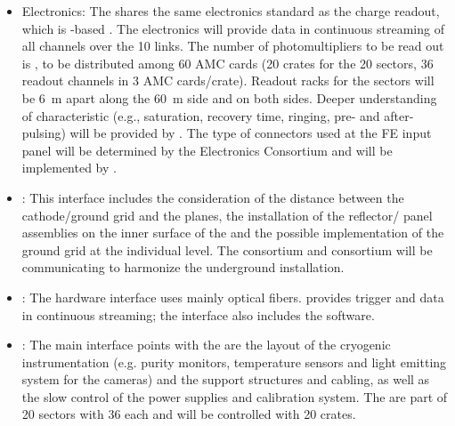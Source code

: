 
\begin{itemize}

\item {} Electronics: The  shares the same  electronics standard as the charge readout, which is -based \cite{utca}. The  electronics will provide data in continuous streaming %
of all  channels over the \SI{10}{\Gbps} links. The number of photomultipliers to be read out is \dpnumpmtch, to be distributed among \num{60} AMC cards (\num{20}  crates for the \num{20}  sectors, \num{36} readout channels in \num{3} AMC cards/crate). Readout racks for the sectors will be \SI{6}{\m} apart along the \SI{60}{\m} side and on both sides. Deeper understanding of  characteristic (e.g., saturation, recovery time, ringing, pre- and after-pulsing) will be provided by  . The type of connectors used at the FE input panel will be determined by the  Electronics Consortium and will be implemented by  .

\item {}: This interface includes the consideration of the distance between the cathode/ground grid and the  planes, the installation of the reflector/ panel assemblies on the inner surface of the  and the possible implementation of the ground grid at the individual  level. The  consortium and  consortium will be communicating to harmonize the underground installation.

\item {}: The hardware interface uses mainly optical fibers.   provides trigger and data in continuous streaming;  the interface also includes the  software.

\item {}: The main interface points with the  are the layout of the cryogenic instrumentation (e.g. purity monitors, temperature sensors and light emitting system for the cameras) and the  support structures and cabling, as well as the slow control of the  power supplies and calibration system. The   are part of \num{20} sectors with \num{36}  each and will be controlled with \num{20}  crates.


\end{itemize}
